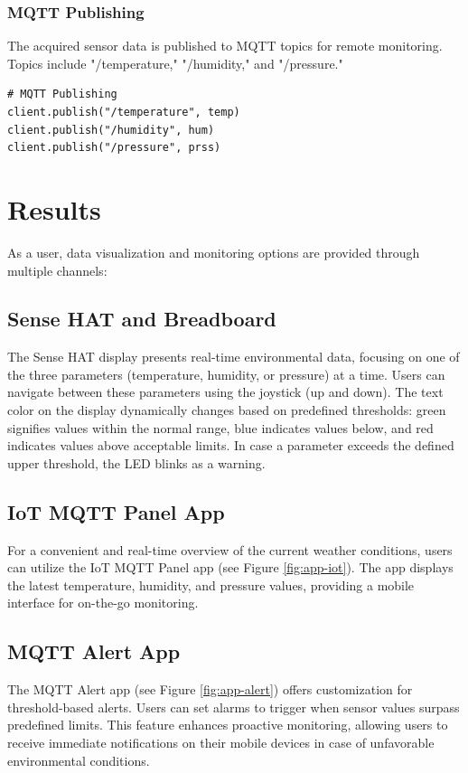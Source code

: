 \documentclass[titlepage]{article}
\begin{document}
\subsubsection{MQTT Publishing}
The acquired sensor data is published to MQTT topics for remote monitoring. Topics include "/temperature," "/humidity," and "/pressure."

\begin{verbatim}
# MQTT Publishing
client.publish("/temperature", temp)
client.publish("/humidity", hum)
client.publish("/pressure", prss)
\end{verbatim}


\newpage
\section{Results}

As a user, data visualization and monitoring options are provided through multiple channels:

\subsection{Sense HAT and Breadboard}
The Sense HAT display presents real-time environmental data, focusing on one of the three parameters (temperature, humidity, or pressure) at a time. Users can navigate between these parameters using the joystick (up and down). The text color on the display dynamically changes based on predefined thresholds: green signifies values within the normal range, blue indicates values below, and red indicates values above acceptable limits. In case a parameter exceeds the defined upper threshold, the LED blinks as a warning.

\subsection{IoT MQTT Panel App}
For a convenient and real-time overview of the current weather conditions, users can utilize the IoT MQTT Panel app (see Figure \ref{fig:app-iot}). The app displays the latest temperature, humidity, and pressure values, providing a mobile interface for on-the-go monitoring.

\subsection{MQTT Alert App}
The MQTT Alert app (see Figure \ref{fig:app-alert}) offers customization for threshold-based alerts. Users can set alarms to trigger when sensor values surpass predefined limits. This feature enhances proactive monitoring, allowing users to receive immediate notifications on their mobile devices in case of unfavorable environmental conditions.
\end{document}
